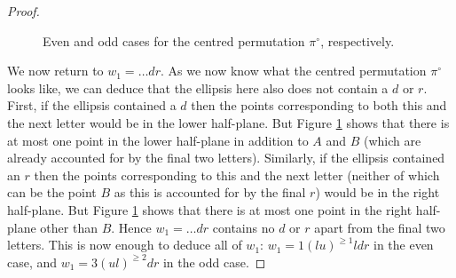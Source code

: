 \documentclass[11pt,a4paper]{article}
\newcommand{\plotptradius}{4pt}
\theoremstyle{definition}
\begin{document}
\begin{proof}
\begin{figure}[h]
\begin{center}
\end{center}
\caption{Even and odd cases for the centred permutation $\pi^{\circ}$, respectively.}
\label{iv}
\end{figure}


We now return to $w_{1} = \dots dr$. As we now know what the centred permutation $\pi^{\circ}$ looks like, we can deduce that the ellipsis here also does not contain a $d$ or $r$. First, if the ellipsis contained a $d$ then the points corresponding to both this and the next letter would be in the lower half-plane. But Figure \ref{iv} shows that there is at most one point in the lower half-plane in addition to $A$ and $B$ (which are already accounted for by the final two letters). Similarly, if the ellipsis contained an $r$ then the points corresponding to this and the next letter (neither of which can be the point $B$ as this is accounted for by the final $r$) would be in the right half-plane. But Figure \ref{iv} shows that there is at most one point in the right half-plane other than $B$. Hence $w_{1} = \dots dr$ contains no $d$ or $r$ apart from the final two letters. This is now enough to deduce all of $w_{1}$: $w_{1} = 1(lu)^{\geq1}ldr$ in the even case, and $w_{1} = 3(ul)^{\geq2}dr$ in the odd case.


\end{proof}
\end{document}
